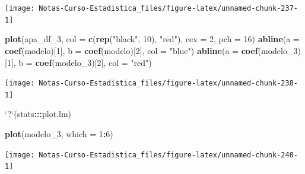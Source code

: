 \documentclass[
  12pt,
]{book}
\newenvironment{Shaded}{\begin{snugshade}}{\end{snugshade}}
\newcommand{\DataTypeTok}[1]{\textcolor[rgb]{0.13,0.29,0.53}{#1}}
\newcommand{\DecValTok}[1]{\textcolor[rgb]{0.00,0.00,0.81}{#1}}
\newcommand{\KeywordTok}[1]{\textcolor[rgb]{0.13,0.29,0.53}{\textbf{#1}}}
\newcommand{\NormalTok}[1]{#1}
\newcommand{\OperatorTok}[1]{\textcolor[rgb]{0.81,0.36,0.00}{\textbf{#1}}}
\newcommand{\StringTok}[1]{\textcolor[rgb]{0.31,0.60,0.02}{#1}}
\theoremstyle{definition}
\theoremstyle{definition}
\theoremstyle{definition}
\theoremstyle{remark}
\begin{document}
\begin{center}\texttt{[image: Notas-Curso-Estadistica\_files/figure-latex/unnamed-chunk-237-1]} \end{center}

\begin{Shaded}
\begin{Highlighting}[]
\KeywordTok{plot}\NormalTok{(apa_df_}\DecValTok{3}\NormalTok{, }\DataTypeTok{col =} \KeywordTok{c}\NormalTok{(}\KeywordTok{rep}\NormalTok{(}\StringTok{"black"}\NormalTok{, }\DecValTok{10}\NormalTok{), }\StringTok{"red"}\NormalTok{), }\DataTypeTok{cex =} \DecValTok{2}\NormalTok{, }
    \DataTypeTok{pch =} \DecValTok{16}\NormalTok{)}
\KeywordTok{abline}\NormalTok{(}\DataTypeTok{a =} \KeywordTok{coef}\NormalTok{(modelo)[}\DecValTok{1}\NormalTok{], }\DataTypeTok{b =} \KeywordTok{coef}\NormalTok{(modelo)[}\DecValTok{2}\NormalTok{], }\DataTypeTok{col =} \StringTok{"blue"}\NormalTok{)}
\KeywordTok{abline}\NormalTok{(}\DataTypeTok{a =} \KeywordTok{coef}\NormalTok{(modelo_}\DecValTok{3}\NormalTok{)[}\DecValTok{1}\NormalTok{], }\DataTypeTok{b =} \KeywordTok{coef}\NormalTok{(modelo_}\DecValTok{3}\NormalTok{)[}\DecValTok{2}\NormalTok{], }
    \DataTypeTok{col =} \StringTok{"red"}\NormalTok{)}
\end{Highlighting}
\end{Shaded}

\begin{center}\texttt{[image: Notas-Curso-Estadistica\_files/figure-latex/unnamed-chunk-238-1]} \end{center}

\begin{Shaded}
\begin{Highlighting}[]
\StringTok{`}\DataTypeTok{?}\StringTok{`}\NormalTok{(stats}\OperatorTok{:::}\NormalTok{plot.lm)}
\end{Highlighting}
\end{Shaded}

\begin{Shaded}
\begin{Highlighting}[]
\KeywordTok{plot}\NormalTok{(modelo_}\DecValTok{3}\NormalTok{, }\DataTypeTok{which =} \DecValTok{1}\OperatorTok{:}\DecValTok{6}\NormalTok{)}
\end{Highlighting}
\end{Shaded}

\begin{center}\texttt{[image: Notas-Curso-Estadistica\_files/figure-latex/unnamed-chunk-240-1]} \end{center}
\end{document}
